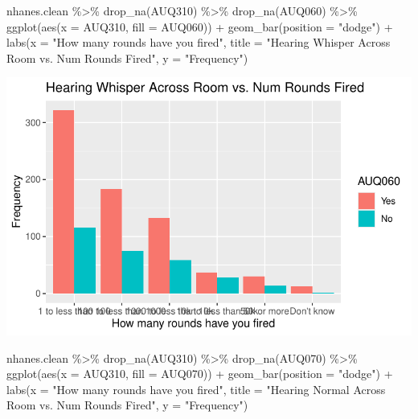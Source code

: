 \documentclass[
  letterpaper,
  DIV=11,
  numbers=noendperiod]{scrreprt}
\newenvironment{Shaded}{\begin{snugshade}}{\end{snugshade}}
\newcommand{\AttributeTok}[1]{\textcolor[rgb]{0.40,0.45,0.13}{#1}}
\newcommand{\FunctionTok}[1]{\textcolor[rgb]{0.28,0.35,0.67}{#1}}
\newcommand{\NormalTok}[1]{\textcolor[rgb]{0.00,0.23,0.31}{#1}}
\newcommand{\SpecialCharTok}[1]{\textcolor[rgb]{0.37,0.37,0.37}{#1}}
\newcommand{\StringTok}[1]{\textcolor[rgb]{0.13,0.47,0.30}{#1}}
\begin{document}
\begin{Shaded}
\begin{Highlighting}[]
\NormalTok{nhanes.clean }\SpecialCharTok{\%\textgreater{}\%}
    \FunctionTok{drop\_na}\NormalTok{(AUQ310) }\SpecialCharTok{\%\textgreater{}\%}
    \FunctionTok{drop\_na}\NormalTok{(AUQ060) }\SpecialCharTok{\%\textgreater{}\%}
    \FunctionTok{ggplot}\NormalTok{(}\FunctionTok{aes}\NormalTok{(}\AttributeTok{x =}\NormalTok{ AUQ310, }\AttributeTok{fill =}\NormalTok{ AUQ060)) }\SpecialCharTok{+} \FunctionTok{geom\_bar}\NormalTok{(}\AttributeTok{position =} \StringTok{"dodge"}\NormalTok{) }\SpecialCharTok{+}
    \FunctionTok{labs}\NormalTok{(}\AttributeTok{x =} \StringTok{"How many rounds have you fired"}\NormalTok{, }\AttributeTok{title =} \StringTok{"Hearing Whisper Across Room vs. Num Rounds Fired"}\NormalTok{,}
        \AttributeTok{y =} \StringTok{"Frequency"}\NormalTok{)}
\end{Highlighting}
\end{Shaded}

\includegraphics{dataviz_files/figure-pdf/unnamed-chunk-59-1.pdf}

\begin{Shaded}
\begin{Highlighting}[]
\NormalTok{nhanes.clean }\SpecialCharTok{\%\textgreater{}\%}
    \FunctionTok{drop\_na}\NormalTok{(AUQ310) }\SpecialCharTok{\%\textgreater{}\%}
    \FunctionTok{drop\_na}\NormalTok{(AUQ070) }\SpecialCharTok{\%\textgreater{}\%}
    \FunctionTok{ggplot}\NormalTok{(}\FunctionTok{aes}\NormalTok{(}\AttributeTok{x =}\NormalTok{ AUQ310, }\AttributeTok{fill =}\NormalTok{ AUQ070)) }\SpecialCharTok{+} \FunctionTok{geom\_bar}\NormalTok{(}\AttributeTok{position =} \StringTok{"dodge"}\NormalTok{) }\SpecialCharTok{+}
    \FunctionTok{labs}\NormalTok{(}\AttributeTok{x =} \StringTok{"How many rounds have you fired"}\NormalTok{, }\AttributeTok{title =} \StringTok{"Hearing Normal Across Room vs. Num Rounds Fired"}\NormalTok{,}
        \AttributeTok{y =} \StringTok{"Frequency"}\NormalTok{)}
\end{Highlighting}
\end{Shaded}
\end{document}
